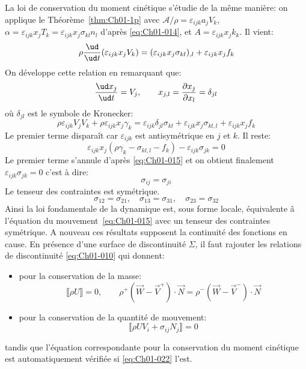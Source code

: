 La loi de conservation du moment cinétique s'étudie de la même manière: on applique le Théorème~\ref{thm:Ch01-1p} avec $\mathcal{A}/\rho=\varepsilon_{ijk}a_jV_k$, $\alpha=\varepsilon_{ijk}x_jT_k=\varepsilon_{ijk}x_j\sigma_{kl}n_l$ d'après \eqref{eq:Ch01-014}, et $A=\varepsilon_{ijk}x_jk_k$.
Il vient:
\begin{equation*}
    \rho \frac{\ud}{\ud t}(\varepsilon_{ijk}x_jV_k)=(\varepsilon_{ijk}x_j\sigma_{kl})_{,l}+\varepsilon_{ijk}x_jf_k
\end{equation*}
On développe cette relation en remarquant que:
\begin{equation*}
    \frac{\ud x_j}{\ud t}=V_j, \qquad x_{j,l}=\frac{\partial x_j}{\partial x_l}=\delta_{jl}
\end{equation*}
où $\delta_{jl}$ est le symbole de Kronecker:
\begin{equation*}
    \rho \varepsilon_{ijk}V_jV_k+\rho\varepsilon_{ijk}x_j\gamma_k=\varepsilon_{ijk}\delta_{jl}\sigma_{kl}+\varepsilon_{ijk}x_j\sigma_{kl,l}+ \varepsilon_{ijk}x_jf_k
\end{equation*}
Le premier terme disparaît car $\varepsilon_{ijk}$ est antisymétrique en $j$ et $k$.
Il reste:
\begin{equation*} 
    \varepsilon_{ijk}x_j(\rho\gamma_k-\sigma_{kl,l}-f_k)-\varepsilon_{ijk}\sigma_{jk}=0
\end{equation*}
Le premier terme s'annule d'après \eqref{eq:Ch01-015} et on obtient finalement $\varepsilon_{ijk}\sigma_{jk}=0$ c'est à dire:
\begin{equation}
    \sigma_{ij}=\sigma_{ji}
    \label{eq:Ch01-019}
\end{equation}
Le tenseur des contraintes est symétrique.
\begin{displaymath}
    \sigma_{12} = \sigma_{21}, \quad \sigma_{13}= \sigma_{31}, \quad \sigma_{23} = \sigma_{32}
\end{displaymath}
Ainsi la loi fondamentale de la dynamique est, sous forme locale, équivalente â l'équation du mouvement~\eqref{eq:Ch01-015} avec un tenseur des contraintes symétrique.
A nouveau ces résultats supposent la continuité des fonctions en cause.
En présence d'une surface de discontinuité $\Sigma$, il faut rajouter les relations de discontinuité \eqref{eq:Ch01-010} qui donnent:
\begin{itemize}
     \item pour la conservation de la masse:
        \begin{equation}
            \llbracket \rho U \rrbracket=0, \qquad \rho^+(\vec{W}-\vec{V}^+)\cdot \vec{N} =\rho^-(\vec{W}-\vec{V}^-)\cdot \vec{N}
            \label{eq:Ch01-020}
        \end{equation}
    \item pour la conservation de la quantité de mouvement:
    \begin{equation}
        \llbracket \rho U V_i +\sigma_{ij}N_j \rrbracket=0
        \label{eq:Ch01-021}
    \end{equation}
\end{itemize}
tandis que l'équation correspondante pour la conservation du moment cinétique est automatiquement vérifiée si \eqref{eq:Ch01-022} l'est.

